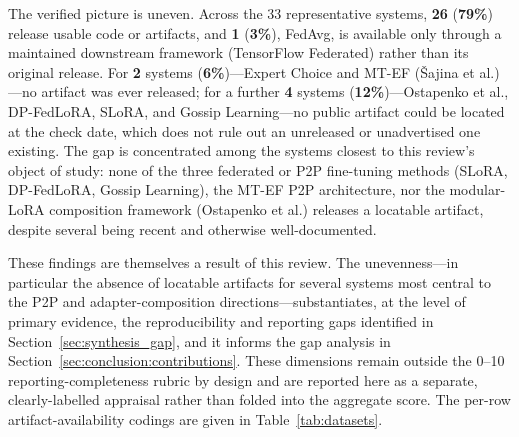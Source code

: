 The verified picture is uneven. Across the 33 representative systems,
\textbf{26} (\textbf{79\%}) release usable code or artifacts, and \textbf{1}
(\textbf{3\%}), FedAvg, is available only through a maintained downstream
framework (TensorFlow Federated) rather than its original release. For
\textbf{2} systems (\textbf{6\%})---Expert Choice and MT-EF
({\v{S}}ajina et al.)---no artifact was ever released; for a further
\textbf{4} systems (\textbf{12\%})---Ostapenko et al., DP-FedLoRA, SLoRA, and
Gossip Learning---no public artifact could be located at the check date,
which does not rule out an unreleased or unadvertised one existing. The gap is concentrated among the systems closest to this
review's object of study: none of the three federated or P2P fine-tuning
methods (SLoRA, DP-FedLoRA, Gossip Learning), the MT-EF P2P architecture, nor
the modular-LoRA composition framework (Ostapenko et al.) releases a locatable
artifact, despite several being recent and otherwise well-documented.

These findings are themselves a result of this review. The unevenness---in
particular the absence of locatable artifacts for several systems most central
to the P2P and adapter-composition directions---substantiates, at the level of
primary evidence, the reproducibility and reporting gaps identified in
Section~\ref{sec:synthesis_gap}, and it informs the gap analysis in
Section~\ref{sec:conclusion:contributions}. These dimensions remain outside the
0--10 reporting-completeness rubric by design and are reported here as a
separate, clearly-labelled appraisal rather than folded into the aggregate
score. The per-row artifact-availability codings are given in
Table~\ref{tab:datasets}.
